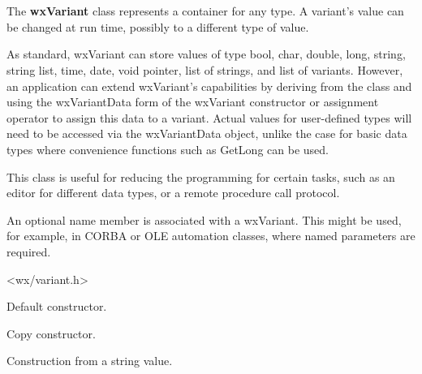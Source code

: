 \section{}\label{wxvariant}

The {\bf wxVariant} class represents a container for any type.
A variant's value can be changed at run time, possibly to a different type of value.

As standard, wxVariant can store values of type bool, char, double, long, string,
string list, time, date, void pointer, list of strings, and list of variants. However, an application can extend wxVariant's capabilities by deriving from the class  and using the wxVariantData form of the wxVariant constructor or assignment operator to assign this data to a variant. Actual values for user-defined types will need to be accessed via the wxVariantData object, unlike the case for basic data types where convenience functions such as GetLong can be used.

This class is useful for reducing the programming for certain tasks, such as an editor
for different data types, or a remote procedure call protocol.

An optional name member is associated with a wxVariant. This might be used, for example, in CORBA
or OLE automation classes, where named parameters are required.




<wx/variant.h>




\label{wxvariantctor}


Default constructor.


Copy constructor.



Construction from a string value.

